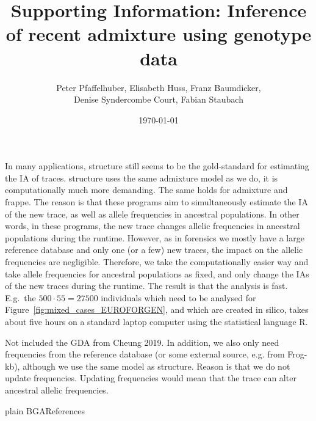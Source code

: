 \documentclass[12pt]{article}
\theoremstyle{definition}
\begin{document}
In many applications, {\sc structure} still seems to be the
gold-standard for estimating the IA of traces. {\sc structure} uses
the same admixture model as we do, it is computationally much more
demanding. The same holds for {\sc admixture} and {\sc frappe}. The
reason is that these programs aim to simultaneously estimate the IA of
the new trace, as well as allele frequencies in ancestral
populations. In other words, in these programs, the new trace changes
allelic frequencies in ancestral populations during the
runtime. However, as in forensics we mostly have a large reference
database and only one (or a few) new traces, the impact on the allelic
frequencies are negligible. Therefore, we take the computationally
easier way and take allele frequencies for ancestral populations as
fixed, and only change the IAs of the new traces during the
runtime. The result is that the analysis is fast. E.g.\ the
$500\cdot 55 = 27500$ individuals which need to be analysed for
Figure~\ref{fig:mixed_cases_EUROFORGEN}, and which are created in
silico, takes about five hours on a standard laptop computer using the
statistical language R.



Not included the GDA from Cheung 2019. In addition, we also only need
frequencies from the reference database (or some external source,
e.g. from Frog-kb), although we use the same model as
structure. Reason is that we do not update frequencies. Updating
frequencies would mean that the trace can alter ancestral allelic
frequencies.


{plain}
{BGA}{References}
% 

\newpage
\setcounter{page}{1}
\setcounter{section}{0}
\setcounter{figure}{0}
\setcounter{table}{0}
\setcounter{equation}{0}
\thispagestyle{empty}

\begin{center}
 \title{\LARGE Supporting Information: Inference
  of recent admixture using genotype data}

~~

\author{\sc Peter Pfaffelhuber, Elisabeth Huss, Franz Baumdicker, \\
  \sc Denise Syndercombe Court, Fabian Staubach}

~

\date{\today}

\maketitle
  
\end{center}
\end{document}
